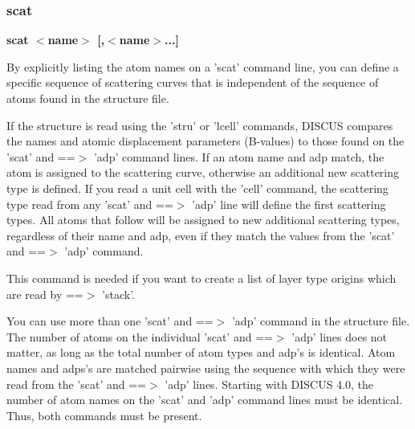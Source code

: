 \subsubsection{scat}
{\bf scat $ <$name$> $ [,$ <$name$> $...] \par }
\par
\vspace{3pt}
By explicitly listing the atom names on a 'scat' command line, you 
can define a specific sequence of scattering curves that is independent 
of the sequence of atoms found in the structure file. 
\par
If the structure is read using the 'stru' or 'lcell' commands, DISCUS 
compares the names and atomic displacement parameters (B-values) to 
those found on the 'scat' and ==$> $ 'adp' command lines. If an atom name 
and adp match, the atom is assigned to the scattering curve, otherwise 
an additional new scattering type is defined. 
If you read a unit cell with the 'cell' command, the scattering type 
read from any 'scat' and ==$> $ 'adp' line will define the first 
scattering types. All atoms that follow will be assigned to new 
additional scattering types, regardless of their name and adp, even 
if they match the values from the 'scat' and ==$> $ 'adp' command. 
\par
This command is needed if you want to create a list of 
layer type origins which are read by ==$> $ 'stack'. 
\par
You can use more than one 'scat' and ==$> $ 'adp' command in the structure 
file. The number of atoms on the individual 'scat' and ==$> $ 'adp' 
lines does not matter, as long as the total number of atom types and 
adp's is identical. Atom names and adps's are matched pairwise using 
the sequence with which they were read from the 'scat' and ==$> $ 'adp' 
lines. 
Starting with DISCUS 4.0, the number of atom names on the 'scat' and 
'adp' command lines must be identical. Thus, both commands must be 
present. 
